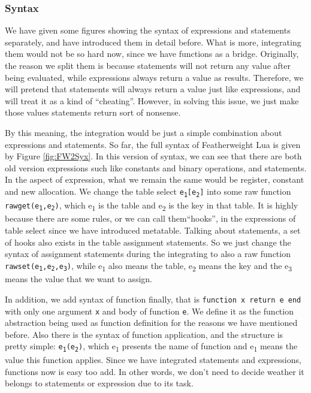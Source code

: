 \documentclass{article}
\begin{document}
\subsubsection{Syntax}\label{sec: FWLUAsyntax}
We have given some figures showing the syntax of expressions and statements separately, and have introduced them in detail before. What is more, integrating them would not be so hard now, since we have functions as a bridge. Originally, the reason we split them is because statements will not return any value after being evaluated, while expressions always return a value as results. Therefore, we will pretend that statements will always return a value just like expressions, and will treat it as a kind of ``cheating''. However, in solving this issue, we just make those values statements return sort of nonsense.

By this meaning, the integration would be just a simple combination about expressions and statements. So far, the full syntax of Featherweight Lua is given by Figure \ref{fig:FW2Syx}. In this version of syntax, we can see that there are both old version expressions such like constants and binary operations, and statements. In the aspect of expression, what we remain the same would be register, constant and new allocation. We change the table select {\tt e\textsubscript{1}[e\textsubscript{2}]} into some raw function {\tt rawget(e\textsubscript{1},e\textsubscript{2})}, which e\textsubscript{1} is the table and e\textsubscript{2} is the key in that table. It is highly because there are some rules, or we can call them``hooks'', in the expressions of table select since we have introduced metatable. Talking about statements, a set of hooks also exists in the table assignment statements. So we just change the syntax of assignment statements during the integrating to also a raw function {\tt rawset(e\textsubscript{1},e\textsubscript{2},e\textsubscript{3})}, while e\textsubscript{1} also means the table, e\textsubscript{2} means the key and the e\textsubscript{3} means the value that we want to assign. 

In addition, we add syntax of function finally, that is {\tt function x return e end} with only one argument {\tt x} and body of function {\tt e}. We define it as the function abstraction being used as function definition for the reasons we have mentioned before. Also there is the syntax of function application, and the structure is pretty simple: {\tt e\textsubscript{1}(e\textsubscript{2})}, which e\textsubscript{1} presents the name of function and e\textsubscript{1} means the value this function applies. Since we have integrated statements and expressions, functions now is easy too add. In other words, we don't need to decide weather it belongs to statements or expression due to its task.
\end{document}
